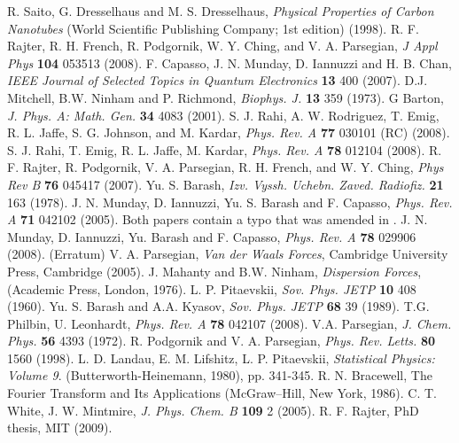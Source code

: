 \documentclass[onecolumn,letterpaper,amsmath,amssymb,floatfix,aps,superscriptaddress]{revtex4}
\begin{document}
\begin{thebibliography}{99}

 R. Saito, G. Dresselhaus and M. S. Dresselhaus, {\sl Physical Properties of Carbon Nanotubes} (World Scientific Publishing Company; 1st edition) (1998).
 R. F. Rajter, R. H. French, R. Podgornik, W. Y. Ching, and V. A. Parsegian, {\sl J Appl Phys} {\bf 104} 053513 (2008).
 F. Capasso, J. N. Munday, D. Iannuzzi and H. B. Chan, {\sl IEEE Journal of Selected Topics in Quantum Electronics} {\bf 13} 400 (2007). 
 D.J. Mitchell, B.W. Ninham and P. Richmond, {\sl Biophys. J.} {\bf 13} 359 (1973).  G Barton, {\sl J. Phys. A: Math. Gen.} {\bf 34} 4083 (2001). S. J. Rahi, A. W. Rodriguez, T. Emig, R. L. Jaffe, S. G. Johnson, and M. Kardar, {\sl Phys. Rev. A } {\bf 77} 030101 (RC)  (2008). S. J. Rahi, T. Emig, R. L. Jaffe, M. Kardar, {\sl Phys. Rev. A} {\bf 78} 012104 (2008).  
 R. F. Rajter, R. Podgornik, V. A. Parsegian, R. H. French, and W. Y. Ching, {\sl Phys Rev B} {\bf 76} 045417 (2007). 
 Yu. S. Barash, {\sl Izv. Vyssh. Uchebn. Zaved. Radiofiz.} {\bf 21} 163 (1978). J. N. Munday, D. Iannuzzi, Yu. S. Barash and F. Capasso, {\sl Phys. Rev. A} {\bf 71} 042102 (2005). Both papers contain a typo that was amended in \cite{erratum}.
 J. N. Munday, D. Iannuzzi, Yu. Barash and F. Capasso, {\sl Phys. Rev. A} {\bf 78} 029906 (2008). (Erratum) 
 V. A. Parsegian, \textsl{Van der Waals Forces}, Cambridge University Press, Cambridge (2005). 
  J. Mahanty and B.W. Ninham, {\sl Dispersion Forces}, (Academic Press, London, 1976).
 L. P. Pitaevskii, {\sl Sov. Phys. JETP} {\bf 10} 408 (1960).
 Yu. S. Barash and A.A. Kyasov, {\sl Sov. Phys. JETP} {\bf 68} 39 (1989).
 T.G. Philbin, U. Leonhardt, {\sl Phys. Rev. A} {\bf 78} 042107 (2008). 
 V.A. Parsegian, {\sl J. Chem. Phys.}  {\bf 56} 4393 (1972). R. Podgornik and V. A. Parsegian, {\sl Phys. Rev. Letts.} {\bf 80} 1560 (1998). 
 L. D. Landau, E. M. Lifshitz, L. P. Pitaevskii, {\sl Statistical Physics: Volume 9}. (Butterworth-Heinemann, 1980), pp. 341-345.
 R. N. Bracewell, The  Fourier Transform and Its Applications (McGraw–Hill, New York, 1986).
 C. T. White, J. W. Mintmire, {\sl J. Phys. Chem. B} {\bf 109} 2 (2005). 
 R. F. Rajter, PhD thesis, MIT (2009).

\end{thebibliography}
\end{document}
